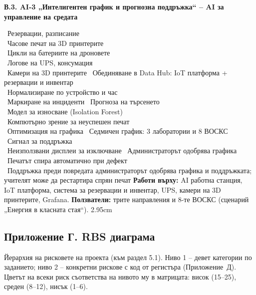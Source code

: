\documentclass[11pt,a4paper]{article}
\begin{document}
\bigskip
\noindent\begin{minipage}{\textwidth}
\textbf{\color{navy}В.3. AI-3 „Интелигентен график и прогнозна поддръжка“ – AI за управление на средата}\par\smallskip
\AppVPipeline
{\textbullet~Резервации, разписание\\
 \textbullet~Часове печат на 3D принтерите\\
 \textbullet~Цикли на батериите на дроновете\\
 \textbullet~Логове на UPS, консумация\\
 \textbullet~Камери на 3D принтерите}
{\textbullet~Обединяване в Data Hub: IoT платформа + резервации и инвентар\\
 \textbullet~Нормализиране по устройство и час\\
 \textbullet~Маркиране на инциденти}
{\textbullet~Прогноза на търсенето\\
 \textbullet~Модел за износване (Isolation Forest)\\
 \textbullet~Компютърно зрение за неуспешен печат\\
 \textbullet~Оптимизация на графика}
{\textbullet~Седмичен график: 3 лаборатории и 8 ВОСКС\\
 \textbullet~Сигнал за поддръжка\\
 \textbullet~Неизползвани дисплеи за изключване}
{\textbullet~Администраторът одобрява графика\\
 \textbullet~Печатът спира автоматично при дефект\\
 \textbullet~Поддръжка преди повредата}
{администраторът одобрява графика и поддръжката; учителят може да рестартира спрян печат}
{\textbf{Работи върху:} AI работна станция, IoT платформа, система за резервации и инвентар, UPS, камери на 3D принтерите, Grafana. \textbf{Ползватели:} трите направления и 8-те ВОСКС (сценарий „Енергия в класната стая“).}
{2.95cm}
\end{minipage}
\clearpage
\subsection*{Приложение Г. RBS диаграма}

Йерархия на рисковете на проекта (към раздел 5.1). Ниво 1 – девет категории по заданието; ниво 2 – конкретни рискове с код от регистъра (Приложение~Д). Цветът на всеки риск съответства на нивото му в матрицата: \colorbox{riskH}{\footnotesize висок (15–25)}, \colorbox{riskM}{\footnotesize среден (8–12)}, \colorbox{riskL}{\footnotesize нисък (1–6)}.
\end{document}
